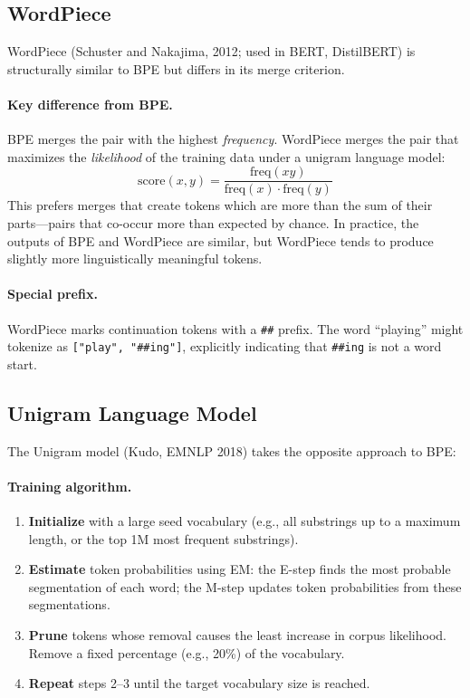 \subsection{WordPiece}
\label{sec:wordpiece}

WordPiece (Schuster and Nakajima, 2012; used in BERT, DistilBERT) is structurally
similar to BPE but differs in its merge criterion.

\paragraph{Key difference from BPE.}
BPE merges the pair with the highest \emph{frequency}.  WordPiece merges the pair that
maximizes the \emph{likelihood} of the training data under a unigram language model:
\[
    \text{score}(x, y) = \frac{\text{freq}(xy)}{\text{freq}(x) \cdot \text{freq}(y)}
\]
This prefers merges that create tokens which are more than the sum of their parts---pairs
that co-occur more than expected by chance.  In practice, the outputs of BPE and WordPiece
are similar, but WordPiece tends to produce slightly more linguistically meaningful tokens.

\paragraph{Special prefix.}
WordPiece marks continuation tokens with a \texttt{\#\#} prefix.  The word
``playing'' might tokenize as \texttt{["play", "\#\#ing"]}, explicitly indicating that
\texttt{\#\#ing} is not a word start.

\subsection{Unigram Language Model}
\label{sec:unigram}

The Unigram model (Kudo, EMNLP 2018) takes the opposite approach to BPE:

\paragraph{Training algorithm.}
\begin{enumerate}
    \item \textbf{Initialize} with a large seed vocabulary (e.g., all substrings up to
          a maximum length, or the top 1M most frequent substrings).
    \item \textbf{Estimate} token probabilities using EM: the E-step finds the most
          probable segmentation of each word; the M-step updates token probabilities
          from these segmentations.
    \item \textbf{Prune} tokens whose removal causes the least increase in corpus
          likelihood.  Remove a fixed percentage (e.g., 20\%) of the vocabulary.
    \item \textbf{Repeat} steps 2--3 until the target vocabulary size is reached.
\end{enumerate}

